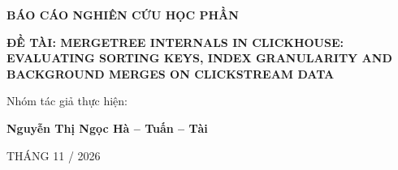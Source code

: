 \documentclass[13pt,a4paper]{extarticle}
\begin{document}
\begin{titlepage}
    \centering
    \vspace*{1cm}
    {\bfseries\fontsize{14}{17}\selectfont BÁO CÁO NGHIÊN CỨU HỌC PHẦN\par}
    \vspace{1.5cm}
    {\bfseries\fontsize{16}{20}\selectfont ĐỀ TÀI: MERGETREE INTERNALS IN CLICKHOUSE: EVALUATING SORTING KEYS, INDEX GRANULARITY AND BACKGROUND MERGES ON CLICKSTREAM DATA\par}
    \vspace{2cm}
    {\fontsize{13}{16}\selectfont Nhóm tác giả thực hiện:\par}
    \vspace{0.3cm}
    {\bfseries\fontsize{13}{16}\selectfont Nguyễn Thị Ngọc Hà -- Tuấn -- Tài\par}
    \vfill
    {\fontsize{13}{16}\selectfont THÁNG 11 / 2026\par}
\end{titlepage}

\tableofcontents
\newpage
\listoftables
\newpage
\listoffigures
\newpage

\setcounter{page}{1}


\newpage


\newpage


\newpage


\newpage


\newpage



\end{document}
